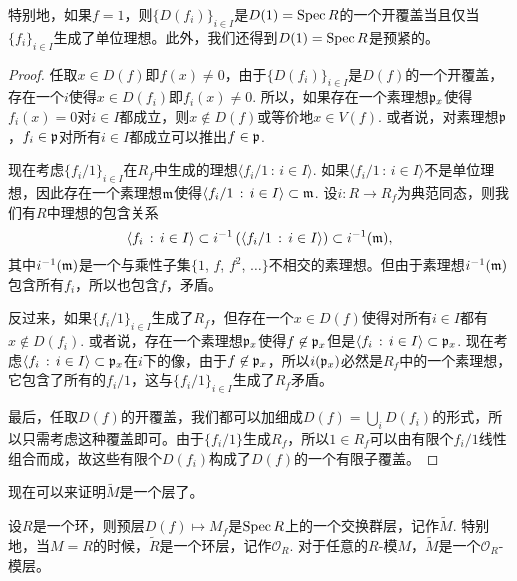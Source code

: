 特别地，如果$f=1$，则$\{D(f_i)\}_{i\in I}$是$D(1)=\operatorname{Spec} R$的一个开覆盖当且仅当$\{f_i\}_{i\in I}$生成了单位理想。此外，我们还得到$D(1)=\operatorname{Spec} R$是预紧的。

\begin{proof}
任取$x\in D(f)$即$f(x)\neq 0$，由于$\{D(f_i)\}_{i\in I}$是$D(f)$的一个开覆盖，存在一个$i$使得$x\in D(f_i)$即$f_i(x)\neq 0$. 所以，如果存在一个素理想$\mathfrak{p}_x$使得$f_i(x)=0$对$i\in I$都成立，则$x\not\in D(f)$或等价地$x\in V(f)$. 或者说，对素理想$\mathfrak{p}$，$f_i\in \mathfrak{p}$对所有$i\in I$都成立可以推出$f\in \mathfrak{p}$.

现在考虑$\{f_i/1\}_{i \in I}$在$R_f$中生成的理想$\langle f_i/1\,:\,i \in I \rangle$. 如果$\langle f_i/1\,:\,i \in I \rangle$不是单位理想，因此存在一个素理想$\mathfrak{m}$使得$\langle f_i/1\,:\,i \in I \rangle\subset \mathfrak{m}$. 设$i:R\to R_f$为典范同态，则我们有$R$中理想的包含关系
\[
	\langle f_i\,:\,i \in I \rangle \subset i^{-1}\left(\langle f_i/1\,:\,i \in I \rangle\right)\subset i^{-1}(\mathfrak{m}),
\]
其中$i^{-1}(\mathfrak{m})$是一个与乘性子集$\{1$, $f$, $f^2$, $\dots\}$不相交的素理想。但由于素理想$i^{-1}(\mathfrak{m})$包含所有$f_i$，所以也包含$f$，矛盾。

反过来，如果$\{f_i/1\}_{i \in I}$生成了$R_f$，但存在一个$x\in D(f)$使得对所有$i\in I$都有$x\not\in D(f_i)$. 或者说，存在一个素理想$\mathfrak{p}_x$使得$f\not\in \mathfrak{p}_x$但是$\langle f_i\,:\,i \in I \rangle\subset \mathfrak{p}_x$. 现在考虑$\langle f_i\,:\,i \in I \rangle\subset \mathfrak{p}_x$在$i$下的像，由于$f\not\in \mathfrak{p}_x$，所以$i(\mathfrak{p}_x)$必然是$R_f$中的一个素理想，它包含了所有的$f_i/1$，这与$\{f_i/1\}_{i \in I}$生成了$R_f$矛盾。

最后，任取$D(f)$的开覆盖，我们都可以加细成$D(f)=\bigcup_i D(f_i)$的形式，所以只需考虑这种覆盖即可。由于$\{f_i/1\}$生成$R_f$，所以$1\in R_f$可以由有限个$f_i/1$线性组合而成，故这些有限个$D(f_i)$构成了$D(f)$的一个有限子覆盖。
\end{proof}

现在可以来证明$\widetilde{M}$是一个层了。

\begin{thm}
设$R$是一个环，则预层$D(f)\mapsto M_f$是$\operatorname{Spec} R$上的一个交换群层，记作$\widetilde{M}$. 特别地，当$M=R$的时候，$\widetilde{R}$是一个环层，记作$\mathcal{O}_R$. 对于任意的$R$-模$M$，$\widetilde{M}$是一个$\mathcal{O}_R$-模层。
\end{thm}

